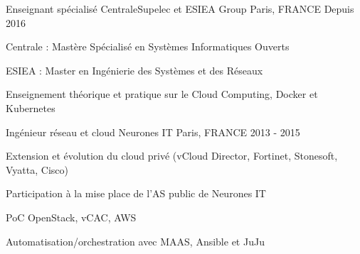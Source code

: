 \begin{cventries}
  \cventry
    {Enseignant spécialisé} %
    {CentraleSupelec et ESIEA Group}
    {Paris, FRANCE} %
    {Depuis 2016} %
    {
      \begin{cvitems} %
      \item {Centrale : Mastère Spécialisé en Systèmes Informatiques Ouverts}
      \item {ESIEA : Master en Ingénierie des Systèmes et des Réseaux}
      \item {Enseignement théorique et pratique sur le Cloud Computing, Docker et Kubernetes}
      \end{cvitems}
    }
  \cventry
    {Ingénieur réseau et cloud}
    {Neurones IT} %
    {Paris, FRANCE} %
    {2013 - 2015} %
    {
      \begin{cvitems} %
      \item {Extension et évolution du cloud privé (vCloud Director, Fortinet, Stonesoft, Vyatta, Cisco)}
      \item {Participation à la mise place de l'AS public de Neurones IT}
        \item {PoC OpenStack, vCAC, AWS}
        \item {Automatisation/orchestration avec MAAS, Ansible et JuJu}
      \end{cvitems}
    }

\end{cventries}
